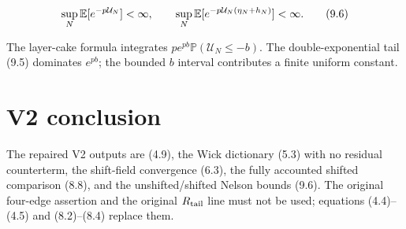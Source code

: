 \documentclass[11pt,a4paper]{article}
\newcommand{\PP}{\mathbb P}
\newcommand{\U}{\mathcal U}
\begin{document}
\[
 \sup_N\E[e^{-p\U_N}]<\infty,\qquad
 \sup_N\E[e^{-p\U_N(\eta_N+h_N)}]<\infty.
\tag{9.6}
\]

\Because The layer-cake formula integrates
$pe^{pb}\PP(\U_N\le-b)$.  The double-exponential tail (9.5) dominates
$e^{pb}$; the bounded $b$ interval contributes a finite uniform constant.

\QedStep

\section{V2 conclusion}

The repaired V2 outputs are (4.9), the Wick dictionary (5.3) with no residual
counterterm, the shift-field convergence (6.3), the fully accounted shifted comparison
(8.8), and the unshifted/shifted Nelson bounds (9.6).  The original four-edge assertion
and the original $R_{\rm tail}$ line must not be used; equations (4.4)--(4.5) and
(8.2)--(8.4) replace them.
\end{document}
